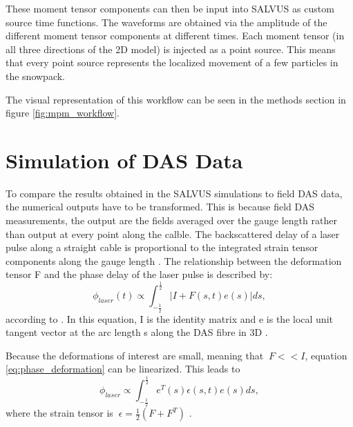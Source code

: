 These moment tensor components can then be input into SALVUS as custom source time functions. The waveforms are obtained via the amplitude of the different moment tensor components at different times. Each moment tensor (in all three directions of the 2D model) is injected as a point source. This means that every point source represents the localized movement of a few particles in the snowpack. \par

The visual representation of this workflow can be seen in the methods section in figure  \ref{fig:mpm_workflow}. 

\section{Simulation of DAS Data}
\label{sec:das_theory}

To compare the results obtained in the SALVUS simulations to field DAS data, the numerical outputs have to be transformed. This is because field DAS measurements, the output are the fields averaged over the gauge length \parencite{lindseyFiberOpticSeismology2021} rather than output at every point along the calble. The backscattered delay of a laser pulse along a straight cable is proportional to the integrated strain tensor components along the gauge length \parencite{noeFrontiersFullwaveformSeismology2025}. The relationship between the deformation tensor F and the phase delay of the laser pulse is described by: \begin{equation}
  \phi_{laser}(t) \propto \int_{-\frac{1}{2}}^{\frac{1}{2}} |I+F(s,t)e(s)|ds
  \label{eq:phase_deformation},
\end{equation} according to \cite{fichtnerTheoryPhaseTransmission2022}. In this equation, I is the identity matrix and e is the local unit tangent vector at the arc length s along the DAS fibre in 3D \parencite{noeFrontiersFullwaveformSeismology2025}. \par 

Because the deformations of interest are small, meaning that $\ F << I$, equation \ref{eq:phase_deformation} can be linearized. This leads to \begin{equation}
  \phi_{laser} \propto \int_{-\frac{1}{2}}^{\frac{1}{2}}e^T(s)\epsilon(s,t)e(s)ds
  \label{eq:linearized_phase_deformation},
\end{equation} where the strain tensor is $\ \epsilon = \frac{1}{2} (F+F^T)$ \parencite{fichtnerTheoryPhaseTransmission2022}. \par

